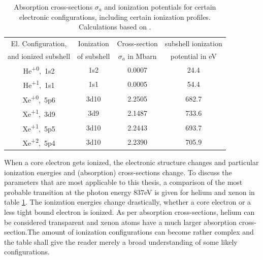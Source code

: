 \begin{table}
	\centering
		\begin{tabular}{ | c | c | c | c | }
		\hline
			El. Configuration, & Ionization & Cross-section  & subshell ionization  \\
			and ionized subshell & of subshell & $\sigma_{a}$ in Mbarn & potential in eV \\ \hline
			He\textsuperscript{+0},\ 1s2 & 1s2 & 0.0007 & 24.4 \\ \hline
			He\textsuperscript{+1},\ 1s1 & 1s1 & 0.0005 & 54.4 \\ \hline
			Xe\textsuperscript{+0},\ 5p6 & 3d10 & 2.2505 & 682.7 \\ \hline
			Xe\textsuperscript{+1},\ 3d9 & 3d9 & 2.1487 & 733.6 \\ \hline
			Xe\textsuperscript{+1},\ 5p5 & 3d10 & 2.2443 & 693.7 \\ \hline
			Xe\textsuperscript{+2},\ 5p4 & 3d10 & 2.2390 & 705.9 \\ \hline
		\end{tabular}
	\caption[Absorption cross-sections and ionization potentials for xenon and helium]{Absorption cross-sections $\sigma_{a}$ and ionization potentials for certain electronic configurations, including certain ionization profiles. Calculations based on \citep{Cowan-1981-Cal}.}
	\label{tab:helium-xenon-ionization}
\end{table}
When a core electron gets ionized, the electronic structure changes and particular ionization energies and (absorption) cross-sections change. To discuss the parameters that are most applicable to this thesis, a comparison of the most probable transition at the photon energy 837eV is given for helium and xenon in table \ref{tab:helium-xenon-ionization}. The ionization energies change drastically, whether a core electron or a less tight bound electron is ionized. As per absorption cross-sections, helium can be considered transparent and xenon atoms have a much larger absorption cross-section.The amount of ionization configurations can become rather complex and the table shall give the reader merely a broad understanding of some likely configurations.\\
